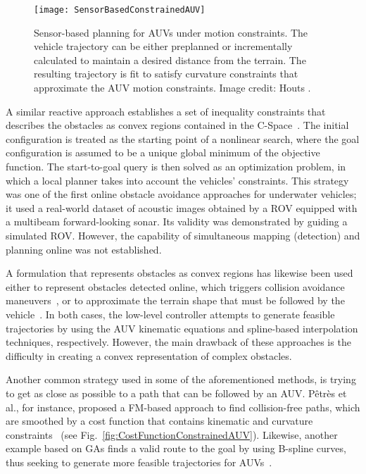 \begin{figure}[htbp]
    \myfloatalign
    \texttt{[image: SensorBasedConstrainedAUV]}
\caption[Sensor-based planning for AUVs under motion constraints.]
{Sensor-based planning for AUVs under motion constraints. The vehicle trajectory
can be either preplanned or incrementally calculated to maintain a desired
distance from the terrain. The resulting trajectory is fit to satisfy
curvature constraints that approximate the AUV motion constraints. Image credit:
Houts \etal\cite{Houts2012,Houts2014}.}
\label{fig:SensorBasedConstrainedAUV}
\end{figure}

A similar reactive approach establishes a set of inequality constraints that
describes the obstacles as convex regions contained in the
\ac{C-Space}~\cite{Petillot2001}. The initial configuration is treated
as the starting point of a nonlinear search, where the goal configuration is
assumed to be a unique global minimum of the objective function. The
start-to-goal query is then solved as an optimization problem, in which a local
planner takes into account the vehicles' constraints. This strategy was one of
the first online obstacle avoidance approaches for underwater vehicles; it used
a real-world dataset of acoustic images obtained by a \ac{ROV} equipped with a
multibeam forward-looking sonar. Its validity was demonstrated by guiding a
simulated \ac{ROV}. However, the capability of simultaneous mapping (detection)
and planning online was not established.

A formulation that represents obstacles as convex regions has likewise been
used either to represent obstacles detected online, which triggers collision
avoidance maneuvers~\cite{Qu2009}, or to approximate the terrain shape that must
be followed by the vehicle~\cite{Murthy2010}. In both cases, the low-level
controller attempts to generate feasible trajectories by using the
\ac{AUV} kinematic equations and spline-based interpolation techniques,
respectively. However, the main drawback of these approaches is the difficulty
in creating a convex representation of complex obstacles.

Another common strategy used in some of the aforementioned methods, is trying to
get as close as possible to a path that can be followed by an \ac{AUV}. Pêtrès
et al., for instance, proposed a \ac{FM}-based approach to find collision-free
paths, which are smoothed by a cost function that contains kinematic and
curvature constraints~\cite{Petres2007} (see
Fig.~\ref{fig:CostFunctionConstrainedAUV}). Likewise, another example based on
\acp{GA} finds a valid route to the goal by using \ac{B-spline} curves, thus
seeking to generate more feasible trajectories for \acp{AUV}~\cite{Cheng2010}.

